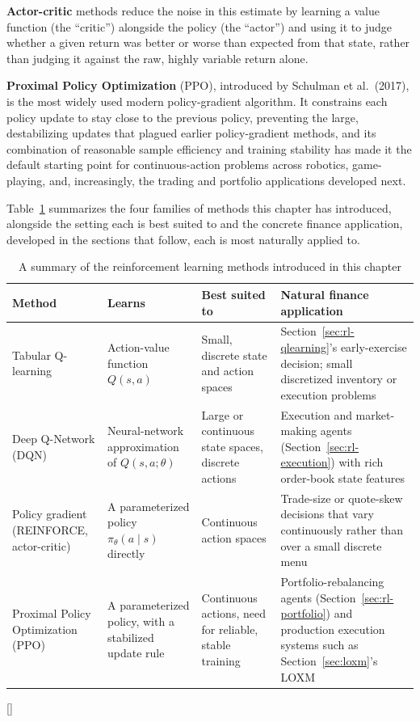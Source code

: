 \documentclass[../ai_in_finance]{subfiles}
\begin{document}
\textbf{Actor-critic} methods reduce the noise in this estimate by learning a value function (the ``critic'') alongside the policy (the ``actor'') and using it to judge whether a given return was better or worse than expected from that state, rather than judging it against the raw, highly variable return alone.

\textbf{Proximal Policy Optimization} (PPO), introduced by Schulman et al.\ (2017), is the most widely used modern policy-gradient algorithm. It constrains each policy update to stay close to the previous policy, preventing the large, destabilizing updates that plagued earlier policy-gradient methods, and its combination of reasonable sample efficiency and training stability has made it the default starting point for continuous-action problems across robotics, game-playing, and, increasingly, the trading and portfolio applications developed next.

Table~\ref{tab:rl_methods} summarizes the four families of methods this chapter has introduced, alongside the setting each is best suited to and the concrete finance application, developed in the sections that follow, each is most naturally applied to.

\begin{table}[htbp]
\centering
\begin{lrbox}{\bookmeasuredbox}
\begin{tabular}{p{2.6cm}p{2.3cm}p{2.3cm}p{6.3cm}}
\toprule
Method & Learns & Best suited to & Natural finance application \\
\midrule
Tabular Q-learning & Action-value function $Q(s,a)$ & Small, discrete state and action spaces & Section~\ref{sec:rl-qlearning}'s early-exercise decision; small discretized inventory or execution problems \\
Deep Q-Network (DQN) & Neural-network approximation of $Q(s,a;\theta)$ & Large or continuous state spaces, discrete actions & Execution and market-making agents (Section~\ref{sec:rl-execution}) with rich order-book state features \\
Policy gradient (REINFORCE, actor-critic) & A parameterized policy $\pi_\theta(a\mid s)$ directly & Continuous action spaces & Trade-size or quote-skew decisions that vary continuously rather than over a small discrete menu \\
Proximal Policy Optimization (PPO) & A parameterized policy, with a stabilized update rule & Continuous actions, need for reliable, stable training & Portfolio-rebalancing agents (Section~\ref{sec:rl-portfolio}) and production execution systems such as Section~\ref{sec:loxm}'s LOXM \\
\bottomrule
\end{tabular}
\end{lrbox}
\ifdim\wd\bookmeasuredbox<0.65\linewidth
\setlength{\bookcapwidth}{0.65\linewidth}
\else
\setlength{\bookcapwidth}{\wd\bookmeasuredbox}
\fi
{}[\bookcapwidth]{
\usebox{\bookmeasuredbox}
}{
\caption{A summary of the reinforcement learning methods introduced in this chapter}
\label{tab:rl_methods}
}
\end{table}
\end{document}
